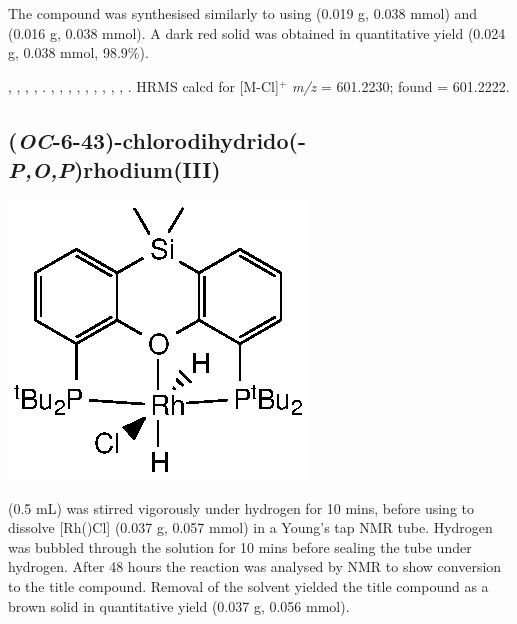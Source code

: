 The compound was synthesised similarly to \ce{[Rh(\tBusixantphos)Cl]} using \tBuxantphos{} (0.019 g, 0.038 mmol) and  (0.016 g, 0.038 mmol).  A dark red solid was obtained in quantitative yield (0.024 g, 0.038 mmol, 98.9\%).  

,
,
,
,
.
,
,
,
,
,
,
,
,
,
.
HRMS calcd for  [M-Cl]$^+$ \emph{m/z} = 601.2230; found = 601.2222.



\subsection*{(\emph{OC}-6-43)-chlorodihydrido(\tBusixantphosk-\emph{P,O,P})rhodium(III)}

\begin{structure}[h]
\begin{center}
\includegraphics{../Structures/SitBuRhClH2.eps}
\end{center}
\end{structure}

 (0.5 mL) was stirred vigorously under hydrogen for 10 mins, before using to dissolve [Rh(\tBusixantphos)Cl] (0.037 g, 0.057 mmol) in a Young's tap NMR tube.  Hydrogen was bubbled through the solution for 10 mins before sealing the tube under hydrogen.  After 48 hours the reaction was analysed by NMR to show  conversion to the title compound.  Removal of the solvent  yielded the title compound as a brown solid in quantitative yield (0.037 g, 0.056 mmol).  

